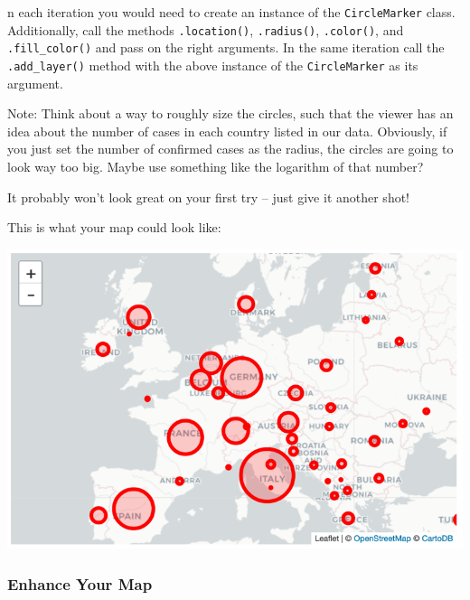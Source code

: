\documentclass[
  11pt,
]{article}
\newenvironment{tipsp}[1]
  {
  \begin{itemize}
  \footnotesize
  \renewcommand{\labelitemi}{
    \raisebox{-.7\height}[0pt][0pt]{
      {\setkeys{Gin}{width=3em,keepaspectratio}
        \texttt{[image: images/\#1.png]}}
    }
  }
  \setlength{\fboxsep}{1em}
  \begin{pbox}
  \item
  }
  {
  \end{pbox}
  \end{itemize}
  }
\begin{document}
\begin{tipsp}
In each iteration you would need to create an instance of the \texttt{CircleMarker} class.
Additionally, call the methods \texttt{.location()}, \texttt{.radius()}, \texttt{.color()}, and \texttt{.fill\_color()} and pass on the right arguments. In the same iteration call the \texttt{.add\_layer()} method with the above instance of the \texttt{CircleMarker} as its argument.

Note: Think about a way to roughly size the circles, such that the viewer has an idea about the number of cases in each country listed in our data. Obviously, if you just set the number of confirmed cases as the radius, the circles are going to look way too big. Maybe use something like the logarithm of that number?

It probably won't look great on your first try -- just give it another shot!

\end{tipsp}

\begin{tipsp}p

This is what your map could look like:

\begin{center}\includegraphics[width=1\linewidth]{plots/p-map-circle} \end{center}

\end{tipsp}

\hypertarget{enhance-your-map}{%
\subsubsection{Enhance Your Map}\label{enhance-your-map}}
\end{document}
